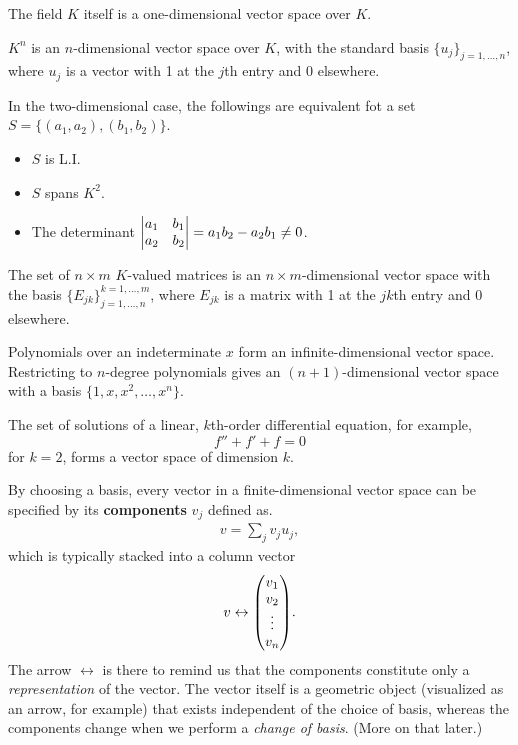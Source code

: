 \begin{example}
	The field $K$ itself is a one-dimensional vector space over $K$.	
\end{example}
\begin{example}
	$K^n$ is an $n$-dimensional vector space over $K$, with the standard basis $\{u_j\}_{j=1,\dots,n}$, where $u_j$ is a vector with 1 at the $j$th entry and 0 elsewhere. 
	
	\noindent In the two-dimensional case, the followings are equivalent fot a set $S = \{(a_1,a_2), (b_1,b_2)\}$.
	\begin{itemize}
		\item $S$ is L.I.
		\item $S$ spans $K^2$.
		\item The determinant $\mqty|a_1&b_1\\a_2&b_2|=a_1b_2 - a_2b_1 \neq 0$.
	\end{itemize}
\end{example}
\begin{example}
	The set of $n\times m$ $K$-valued matrices is an $n\times m$-dimensional vector space with the basis $\{E_{jk}\}_{j=1,\dots,n}^{k=1,\dots,m}$, where $E_{jk}$ is a matrix with 1 at the $jk$th entry and 0 elsewhere. 
\end{example}
\begin{example}
	Polynomials over an indeterminate $x$ form an infinite-dimensional vector space. Restricting to $n$-degree polynomials gives an $(n+1)$-dimensional vector space with a basis $\{1,x,x^2,\dots,x^n\}$.
\end{example}
\begin{example}
	The set of solutions of a linear, $k$th-order differential equation, for example, $$f''+f'+f=0$$ for $k=2$, forms a vector space of dimension $k$.
\end{example}

By choosing a basis, every vector in a finite-dimensional vector space can be specified by its {\bf components} $v_j$ defined as.
\begin{align}
	v = \sum_j v_j u_j,
\end{align}
which is typically stacked into a column vector
\begin{align}
	v \leftrightarrow \mqty(v_1 \\ v_2 \\ \vdots \\ v_n).
\end{align}
The arrow $\leftrightarrow$ is there to remind us that the components constitute only a \emph{representation} of the vector. The vector itself is a geometric object (visualized as an arrow, for example) that exists independent of the choice of basis, whereas the components change when we perform a \emph{change of basis}. (More on that later.)

